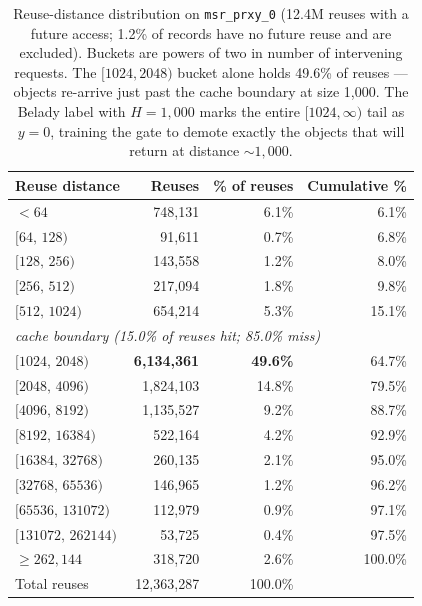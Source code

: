 \documentclass[letterpaper,twocolumn,10pt]{article}
\begin{document}
\begin{table}[t]
\centering
\small
\begin{tabular}{lrrr}
\toprule
Reuse distance & Reuses & \% of reuses & Cumulative \% \\
\midrule
$<64$              &       748{,}131 &  6.1\% &   6.1\% \\
$[64,\,128)$       &        91{,}611 &  0.7\% &   6.8\% \\
$[128,\,256)$      &       143{,}558 &  1.2\% &   8.0\% \\
$[256,\,512)$      &       217{,}094 &  1.8\% &   9.8\% \\
$[512,\,1024)$     &       654{,}214 &  5.3\% &  15.1\% \\
\midrule
\multicolumn{4}{l}{\textit{cache boundary \quad (15.0\% of reuses hit; 85.0\% miss)}} \\
\midrule
$[1024,\,2048)$    &  \textbf{6{,}134{,}361} & \textbf{49.6\%} &  64.7\% \\
$[2048,\,4096)$    &     1{,}824{,}103 & 14.8\% &  79.5\% \\
$[4096,\,8192)$    &     1{,}135{,}527 &  9.2\% &  88.7\% \\
$[8192,\,16384)$   &       522{,}164 &  4.2\% &  92.9\% \\
$[16384,\,32768)$  &       260{,}135 &  2.1\% &  95.0\% \\
$[32768,\,65536)$  &       146{,}965 &  1.2\% &  96.2\% \\
$[65536,\,131072)$ &       112{,}979 &  0.9\% &  97.1\% \\
$[131072,\,262144)$ &       53{,}725 &  0.4\% &  97.5\% \\
$\geq 262{,}144$   &       318{,}720 &  2.6\% & 100.0\% \\
\midrule
Total reuses       & 12{,}363{,}287 & 100.0\% & \\
\bottomrule
\end{tabular}
\caption{Reuse-distance distribution on \texttt{msr\_prxy\_0} (12.4M reuses with a future access; 1.2\% of records have no future reuse and are excluded). Buckets are powers of two in number of intervening requests. The $[1024, 2048)$ bucket alone holds 49.6\% of reuses --- objects re-arrive just past the cache boundary at size 1{,}000. The Belady label with $H = 1{,}000$ marks the entire $[1024, \infty)$ tail as $y = 0$, training the gate to demote exactly the objects that will return at distance ${\sim}1{,}000$.}
\label{tab:msr_prxy_rdist}
\end{table}
\end{document}
